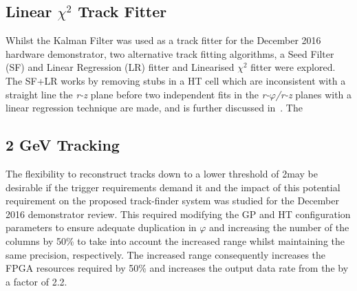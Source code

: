 %
%
%
%

\subsection{Linear $\chi^{2}$ Track Fitter}
Whilst the Kalman Filter was used as a track fitter for the December 2016 hardware demonstrator, two alternative track fitting algorithms, a Seed Filter (SF) and Linear Regression (LR) fitter and Linearised $\chi^{2}$ fitter were explored.
The SF+LR works by removing stubs in a HT cell which are inconsistent with a straight line the \emph{r-z} plane before  two independent fits in the \emph{r-$\varphi$/r-z} planes with a linear regression technique are made, and is further discussed in~\cite{TMTT_FLP}.
The 



\subsection{2 GeV Tracking}
The flexibility to reconstruct tracks down to a lower \pT threshold of 2\GeV may be desirable if the trigger requirements demand it and the impact of this potential requirement on the proposed track-finder system was studied for the December 2016 demonstrator review.
This required modifying the GP and HT configuration parameters to ensure adequate duplication in $\varphi$ and increasing the number of the \qpt columns by 50\% to take into account the increased \pt range whilst maintaining the same precision, respectively.
The increased \qpt range consequently increases the FPGA resources required by 50\% and increases the output data rate from the \HT by a factor of 2.2.

